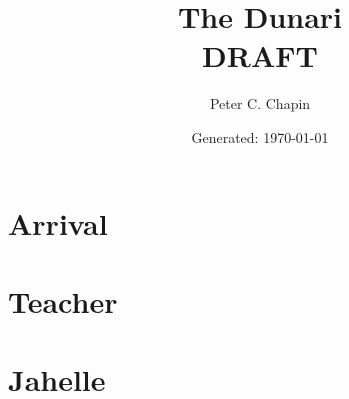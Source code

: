 \documentclass{scrbook}
\begin{document}
\title{The Dunari\\DRAFT}
\author{Peter C. Chapin}
\date{Generated: \today}
\maketitle



\part{Arrival}











\part{Teacher}











\part{Jahelle}










\end{document}

